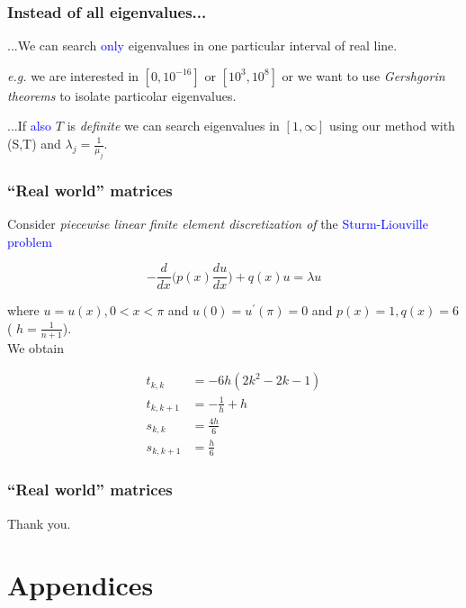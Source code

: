 \documentclass{beamer}
\theoremstyle{definition} \newtheorem{de}{Def}
\theoremstyle{remark} \newtheorem{os}[de]{Remark}
\theoremstyle{plain} \newtheorem{te}[de]{Teo}
\theoremstyle{plain} \newtheorem{co}[de]{Cor}
\theoremstyle{plain} \newtheorem{pr}[de]{Prop}
\theoremstyle{plain} \newtheorem{lem}[de]{Lemm}
\theoremstyle{remark} \newtheorem{rem}[de]{Remark}
\begin{document}
\begin{frame}
  \frametitle{Instead of all eigenvalues...}

  ...We can search \textcolor{blue}{only} eigenvalues in one particular interval of real line.

  \pause

  \emph{e.g.} we are interested in $[0,10^{-16}]$ or $[10^{3},10^{8}]$ or we want to use \emph{Gershgorin theorems} to isolate particolar eigenvalues.

  \pause

  ...If \textcolor{blue}{also} $T$ is \emph{definite} we can search eigenvalues in $[1,\infty]$ using our method with (S,T) and $\lambda_j=\frac{1}{\mu_j}$.

\end{frame}

\begin{frame}
  \frametitle{``Real world'' matrices}

  Consider \emph{piecewise linear finite element discretization of} the \textcolor{blue}{Sturm-Liouville problem}

  \begin{equation*}
    - \frac{d}{d x}\Big( p(x) \frac{d u}{d x} \Big) + q(x) u = \lambda u
  \end{equation*}

  where $u=u(x),0<x<\pi$ and $u(0)=u^{'}(\pi)=0$ and $p(x)=1,q(x)=6$ ( $h=\frac{1}{n+1}$). \\
  We obtain
  
  \begin{align*}
    t_{k,k} &= -6 h (2 k^2 -2 k -1)\\
    t_{k,k+1} &= -\frac{1}{h} + h\\
    s_{k,k} &= \frac{4 h}{6}\\
    s_{k,k+1} &= \frac{h}{6}
  \end{align*}

\end{frame}

\begin{frame}
  \frametitle{``Real world'' matrices}

  

\end{frame}

\begin{frame}
  Thank you.
\end{frame}

\section{Appendices}
\end{document}
